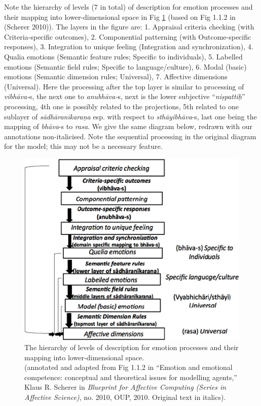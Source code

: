 Note the hierarchy of levels (7 in total) of description for emotion processes and their mapping into lower-dimensional space in Fig \ref{chap7-fig1} (based on Fig 1.1.2 in (Scherer 2010)). The layers in the figure are: 1. Appraisal criteria checking (with Criteria-specific outcomes), 2. Componential patterning (with Outcome-specific responses), 3. Integration to unique feeling (Integration and synchronization), 4. Qualia emotions (Semantic feature rules; Specific to individuals), 5. Labelled emotions (Semantic field rules; Specific to language/culture), 6. Modal (basic) emotions (Semantic dimension rules; Universal), 7. Affective dimensions (Universal). Here the processing after the top layer is similar to processing of \textsl{vibhāva-}s, the next one to \textsl{anubhāva-}s, next is the lower subjective “\textsl{niṣpattiḥ}” processing, 4th one is possibly related to the projections, 5th related to one sublayer of \textsl{sādhāranīkaraṇa} esp. with respect to \textsl{sthāyibhāva}-s, last one being the mapping of \textsl{bhāva}-s to \textsl{rasa}. We give the same diagram below, redrawn with our annotations non-italicised. Note the sequential processing in the original diagram for the model; this may not be a necessary feature. 

\begin{figure}[H]
\centering
\includegraphics{figures/3.eps}
\caption{The hierarchy of levels of description for emotion processes and their mapping into lower-dimensional space.\\
(annotated and adapted from Fig 1.1.2 in “Emotion and emotional competence: conceptual and theoretical issues for modelling agents,” Klaus R. Scherer in \textsl{Blueprint for Affective Computing (Series in Affective Science)}, no. 2010, OUP, 2010. Original text in italics).}\label{chap7-fig1}
\end{figure}

